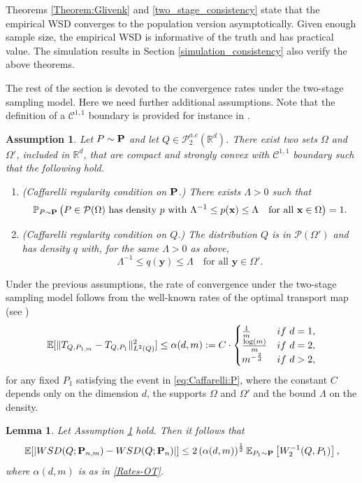 \documentclass{imsart}
\newtheorem {Lemma}[Proposition] {Lemma}
\newtheorem {Assumption}[Proposition]{Assumption}
\numberwithin{equation}{section}
\def\R{\mathbb{R}}
\def\E{\mathbb{E}}
\def\x{\mathbf{x}}
\def\y{\mathbf{y}}
\def\E{\mathbb E}
\def\x{\mathbf x}
\def\y{\mathbf y}
\begin{document}
Theorems \ref{Theorem:Glivenk} and \ref{two_stage_consistency} state that the empirical WSD converges to the population version asymptotically. Given enough sample size, the empirical WSD is informative of the truth and has practical value. The simulation results in Section \ref{simulation_consistency} also verify the above theorems. 

The rest of the section is devoted to  the convergence rates under the two-stage sampling model. Here we need further additional assumptions. 
Note that the definition of a $\mathcal{C}^{1,1}$ boundary is provided for instance in \cite{gilbarg2001elliptic}.

\begin{Assumption}\label{Assumtion-Reg}
	Let $P\sim {\bf P}$ and let $Q\in \mathcal{P}^{a.c}_2(\R^d) $.
	There exist two sets $\Omega$ and $\Omega'$, included in $\R^d$, that are compact and strongly convex with $\mathcal{C}^{1,1}$ boundary such that the following hold.
	\begin{enumerate}
		\item {(\it Caffarelli regularity condition on ${\bf P}$.)} There exists $\Lambda>0$ such that 
		\begin{equation}
			\label{eq:Caffarelli:P}
			\mathbb{P}_{P\sim {\bf P}}\left( \text{$P\in \mathcal{P}(\Omega)$ has density $p$ with 
				$ \Lambda^{-1}\leq p(\x) \leq \Lambda \quad \text{for all }\x\in \Omega $} \right)=1.
		\end{equation}
		\item {(\it Caffarelli regularity condition on $Q$.)} The distribution $Q$ is in $ \mathcal{P}(\Omega')$ and has density $q$ with, for the same $\Lambda >0$ as above, 
		$$ \Lambda^{-1}\leq q(\y) \leq \Lambda \quad \text{for all }\y\in \Omega'.  $$
	\end{enumerate}
	
\end{Assumption}
Under the previous assumptions, the rate of convergence under the two-stage sampling model follows from the well-known rates of the optimal transport map (see \cite[Corollary~7]{Manole.2024-Aos})
\begin{equation}
	\label{Rates-OT}
	\E[\| T_{Q,P_{1,m}}-T_{Q,P_1}\|_{L^2(Q)}^2]\leq \alpha(d,m):=C\cdot \begin{cases}
		\frac{1}{m} & {\rm if }
		\ d=1,\\
		\frac{\log(m)}{m} & {\rm if }
		\ d=2,\\
		m^{-\frac{2}{d}} & {\rm if }
		\ d>2,
	\end{cases} 
\end{equation}
for any fixed $P_1$ satisfying the event in \eqref{eq:Caffarelli:P},
where the constant $C$ depends only on the dimension $d$, the supports  $\Omega$ and $\Omega' $ and the bound $\Lambda$ on the density.
\begin{Lemma} 
	\label{lemma:rate:two:stage}
	Let Assumption \ref{Assumtion-Reg} hold. Then it follows that 
	$$ \E[|  {\rm WSD}(Q; {\bf P}_{n,m})- {\rm WSD}(Q; {\bf P}_n)| ] \leq  2\left( \alpha(d,m)\right)^{\frac{1}{2}} \E_{P_1\sim {\bf P}}\left[ W_2^{-1}(Q,P_{1})\right] ,$$
	where $\alpha(d,m)$ is as in \eqref{Rates-OT}.
\end{Lemma}
\end{document}
